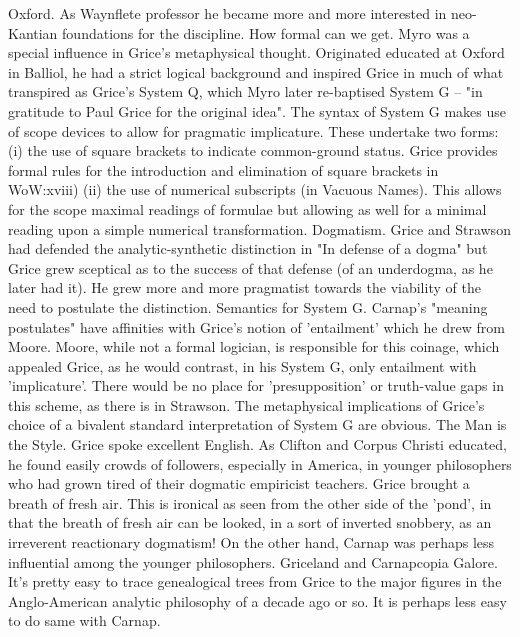 \documentclass[10pt,titlepage]{book}
\begin{document}
{Oxford. As  Waynflete professor he became more and more interested in neo-Kantian 
 foundations for the discipline. 
How  formal can we get. Myro was a special influence in Grice's 
metaphysical thought.  Originated educated at Oxford in Balliol, he had a strict 
logical background and  inspired Grice in much of what transpired as Grice's 
System Q, which Myro later  re-baptised System G -- "in gratitude to Paul Grice 
for the original idea". The  syntax of System G makes use of scope devices to 
allow for pragmatic  implicature. These undertake two forms: (i) the use of 
square brackets to  indicate common-ground status. Grice provides formal 
rules for the introduction  and elimination of square brackets in WoW:xviii) 
(ii)  the use of numerical subscripts (in Vacuous Names). This allows for 
the scope  maximal readings of formulae but allowing as well for a minimal 
reading upon a  simple numerical transformation.  
Dogmatism.  Grice and Strawson had defended the analytic-synthetic 
distinction in "In  defense of a dogma" but Grice grew sceptical as to the success 
of that defense  (of an underdogma, as he later had it). He grew more and 
more pragmatist towards  the viability of the need to postulate the 
distinction. 
Semantics  for System G. Carnap's "meaning postulates" have affinities with 
Grice's notion  of 'entailment' which he drew from Moore. Moore, while not 
a formal logician, is  responsible for this coinage, which appealed Grice, 
as he would contrast, in his  System G, only entailment with 'implicature'. 
There would be no place for  'presupposition' or truth-value gaps in this 
scheme, as there is in Strawson.  The metaphysical implications of Grice's 
choice of a bivalent standard  interpretation of System G are obvious. 
The  Man is the Style. Grice spoke excellent English. As Clifton and Corpus 
Christi  educated, he found easily crowds of followers, especially in 
America, in younger  philosophers who had grown tired of their dogmatic 
empiricist teachers. Grice  brought a breath of fresh air. This is ironical as seen 
from the other side of  the 'pond', in that the breath of fresh air can be 
looked, in a sort of inverted  snobbery, as an irreverent reactionary 
dogmatism!  On the other hand,  Carnap was perhaps less influential among the 
younger philosophers.   
Griceland  and Carnapcopia Galore. It's pretty easy to trace genealogical 
trees from Grice  to the major figures in the Anglo-American analytic 
philosophy of a decade ago  or so. It is perhaps less easy to do same with Carnap. 
}
\end{document}
